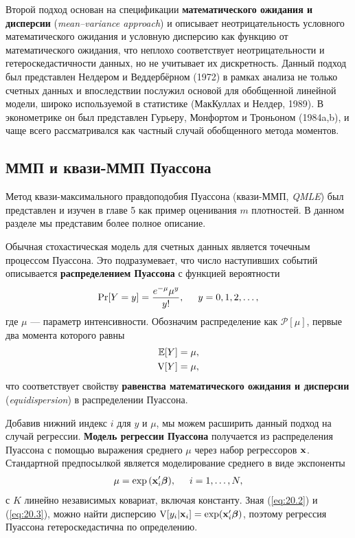 Второй подход основан на спецификации \textbf{математического ожидания и дисперсии} (\textit{mean--variance approach}) и описывает неотрицательность условного математического ожидания и условную дисперсию как функцию от математического ожидания, что неплохо соответствует неотрицательности и гетероскедастичности данных, но не учитывает их дискретность. Данный подход был представлен Нелдером и Веддербёрном (1972) в рамках анализа не только счетных данных и впоследствии послужил основой для обобщенной линейной модели, широко используемой в статистике (МакКуллах и Нелдер, 1989). В эконометрике он был представлен Гурьеру, Монфортом и Троньоном (1984a,b), и чаще всего рассматривался как частный случай обобщенного метода моментов.


\subsection{ММП и квази-ММП Пуассона}\label{sec:20.2.2}

\noindent
Метод квази-максимального правдоподобия Пуассона (квази-ММП, \textit{QMLE}) был представлен и изучен в главе 5 %
как пример оценивания $m$ плотностей. В данном разделе мы представим более полное описание.

Обычная стохастическая модель для счетных данных является точечным процессом Пуассона. Это подразумевает, что число наступивших событий описывается \textbf{распределением Пуассона} с функцией вероятности
    \begin{align}\label{eq:20.1}
    \Pr [Y=y]=\frac{e^{-\mu}\mu^y}{y!}, \hspace{0.5cm} y=0,1,2,\ldots ,
    \end{align}
где $\mu$ --- параметр интенсивности. Обозначим распределение как $\mathcal{P}[\mu]$, первые два момента которого равны
    \begin{align}\label{eq:20.2}
    \E[Y] = \mu, \\
    \V[Y] = \mu, \notag
    \end{align}
что соответствует свойству \textbf{равенства математического ожидания и дисперсии} (\textit{equidispersion}) в распределении Пуассона.

Добавив нижний индекс $i$ для $y$ и $\mu$, мы можем расширить данный подход на случай регрессии. \textbf{Модель регрессии Пуассона} получается из распределения Пуассона с помощью выражения среднего $\mu$ через набор регрессоров $\x$. Стандартной предпосылкой является моделирование среднего в виде экспоненты
    \begin{align}\label{eq:20.3}
    \mu = \exp{(\xib)}, \hspace{0.5cm} i=1,\ldots ,N,
    \end{align}
с $K$ линейно независимых ковариат, включая константу. Зная (\ref{eq:20.2}) и (\ref{eq:20.3}), можно найти дисперсию $\V[y_i|\x_i] = \exp(\xib)$, поэтому регрессия Пуассона гетероскедастична по определению.

